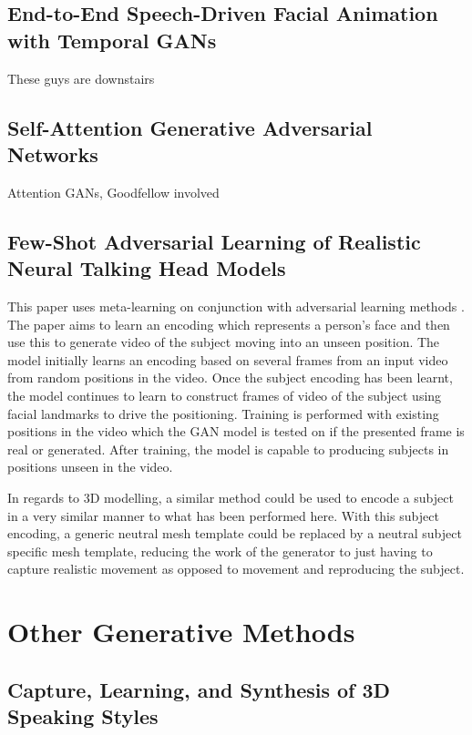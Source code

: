 \documentclass[12pt]{article}
\begin{document}
\subsection{End-to-End Speech-Driven Facial Animation with Temporal GANs}
These guys are downstairs \cite{Vougioukas2018}

\subsection{Self-Attention Generative Adversarial Networks}
Attention GANs, Goodfellow involved \cite{Zhang2018}

\subsection{Few-Shot Adversarial Learning of Realistic Neural Talking Head Models}
This paper uses meta-learning on conjunction with adversarial learning methods \cite{Zakharov2019}.
The paper aims to learn an encoding which represents a person's face and then use this to generate video of the subject moving into an unseen position.
The model initially learns an encoding based on several frames from an input video from random positions in the video.
Once the subject encoding has been learnt, the model continues to learn to construct frames of video of the subject using facial landmarks to drive the positioning.
Training is performed with existing positions in the video which the GAN model is tested on if the presented frame is real or generated.
After training, the model is capable to producing subjects in positions unseen in the video.

In regards to 3D modelling, a similar method could be used to encode a subject in a very similar manner to what has been performed here.
With this subject encoding, a generic neutral mesh template could be replaced by a neutral subject specific mesh template, reducing the work of the generator to just having to capture realistic movement as opposed to movement and reproducing the subject.

\section{Other Generative Methods}
\subsection{Capture, Learning, and Synthesis of {3D} Speaking Styles}
\cite{Cudeiro2019}
\end{document}
